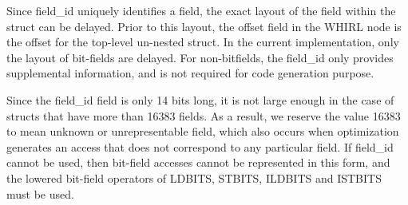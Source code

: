 Since field\_id uniquely identifies a field, the exact layout of
the field within the struct can be delayed. Prior to this layout,
the offset field in the WHIRL node is the offset for the top-level
un-nested struct. In the current implementation, only the layout of
bit-fields are delayed. For non-bitfields, the field\_id only provides
supplemental information, and is not required for code generation
purpose.

Since the field\_id field is only 14 bits long, it is not large
enough in the case of structs that have more than 16383 fields. As
a result, we reserve the value 16383 to mean unknown or unrepresentable
field, which also occurs when optimization generates an access that
does not correspond to any particular field. If field\_id cannot be
used, then bit-field accesses cannot be represented in this form,
and the lowered bit-field operators of
%
LDBITS,
%
STBITS,
%
ILDBITS and
%
ISTBITS must be used.

